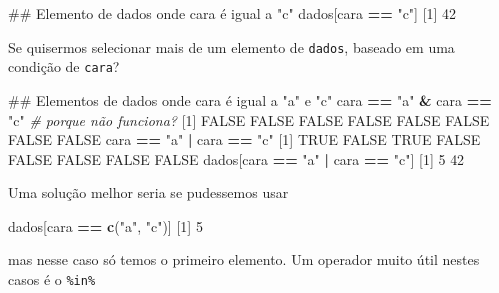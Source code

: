 \documentclass[10pt,a4paper]{book}
\newenvironment{Shaded}{\begin{snugshade}}{\end{snugshade}}
\newcommand{\KeywordTok}[1]{\textcolor[rgb]{0.13,0.29,0.53}{\textbf{#1}}}
\newcommand{\DecValTok}[1]{\textcolor[rgb]{0.00,0.00,0.81}{#1}}
\newcommand{\StringTok}[1]{\textcolor[rgb]{0.31,0.60,0.02}{#1}}
\newcommand{\CommentTok}[1]{\textcolor[rgb]{0.56,0.35,0.01}{\textit{#1}}}
\newcommand{\OtherTok}[1]{\textcolor[rgb]{0.56,0.35,0.01}{#1}}
\newcommand{\OperatorTok}[1]{\textcolor[rgb]{0.81,0.36,0.00}{\textbf{#1}}}
\newcommand{\NormalTok}[1]{#1}
\begin{document}
\begin{Shaded}
\begin{Highlighting}[]
\NormalTok{## Elemento de dados onde cara é igual a "c"}
\NormalTok{dados[cara }\OperatorTok{==}\StringTok{ "c"}\NormalTok{]}
\NormalTok{[}\DecValTok{1}\NormalTok{] }\DecValTok{42}
\end{Highlighting}
\end{Shaded}

Se quisermos selecionar mais de um elemento de \texttt{dados}, baseado
em uma condição de \texttt{cara}?

\begin{Shaded}
\begin{Highlighting}[]
\NormalTok{## Elementos de dados onde cara é igual a "a" e "c"}
\NormalTok{cara }\OperatorTok{==}\StringTok{ "a"} \OperatorTok{&}\StringTok{ }\NormalTok{cara }\OperatorTok{==}\StringTok{ "c"} \CommentTok{# porque não funciona?}
\NormalTok{[}\DecValTok{1}\NormalTok{] }\OtherTok{FALSE} \OtherTok{FALSE} \OtherTok{FALSE} \OtherTok{FALSE} \OtherTok{FALSE} \OtherTok{FALSE} \OtherTok{FALSE} \OtherTok{FALSE}
\NormalTok{cara }\OperatorTok{==}\StringTok{ "a"} \OperatorTok{|}\StringTok{ }\NormalTok{cara }\OperatorTok{==}\StringTok{ "c"}
\NormalTok{[}\DecValTok{1}\NormalTok{]  }\OtherTok{TRUE} \OtherTok{FALSE}  \OtherTok{TRUE} \OtherTok{FALSE} \OtherTok{FALSE} \OtherTok{FALSE} \OtherTok{FALSE} \OtherTok{FALSE}
\NormalTok{dados[cara }\OperatorTok{==}\StringTok{ "a"} \OperatorTok{|}\StringTok{ }\NormalTok{cara }\OperatorTok{==}\StringTok{ "c"}\NormalTok{]}
\NormalTok{[}\DecValTok{1}\NormalTok{]  }\DecValTok{5} \DecValTok{42}
\end{Highlighting}
\end{Shaded}

Uma solução melhor seria se pudessemos usar

\begin{Shaded}
\begin{Highlighting}[]
\NormalTok{dados[cara }\OperatorTok{==}\StringTok{ }\KeywordTok{c}\NormalTok{(}\StringTok{"a"}\NormalTok{, }\StringTok{"c"}\NormalTok{)]}
\NormalTok{[}\DecValTok{1}\NormalTok{] }\DecValTok{5}
\end{Highlighting}
\end{Shaded}

mas nesse caso só temos o primeiro elemento. Um operador muito útil
nestes casos é o \texttt{\%in\%}

\begin{Shaded}
\end{Shaded}
\end{document}
